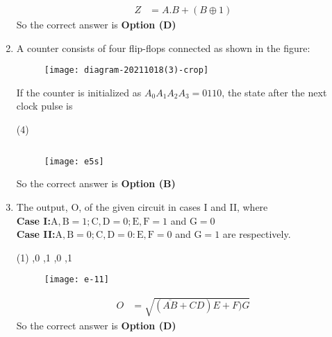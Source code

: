 \begin{enumerate}
\begin{answer}
\begin{align*}
Z&=A . B+(B \oplus 1)
\end{align*}
So the correct answer is \textbf{Option (D)}
\end{answer}
	\item A counter consists of four flip-flops connected as shown in the figure:\\
	\begin{figure}[H]
		\centering
		\texttt{[image: diagram-20211018(3)-crop]}
	\end{figure}
	If the counter is initialized as $A_{0} A_{1} A_{2} A_{3}=0110$, the state after the next clock pulse is
	{}
\begin{tasks}(4)
\end{tasks}
\begin{answer}$\left. \right. $
\begin{figure}[H]
	\centering
	\texttt{[image: e5s]}
\end{figure}
So the correct answer is \textbf{Option (B)}
\end{answer}
	\item The output, $\mathrm{O}$, of the given circuit in cases I and II, where\\
	\textbf{Case I:}\quad $\mathrm{A}, \mathrm{B}=1 ; \mathrm{C}, \mathrm{D}=0 ; \mathrm{E}, \mathrm{F}=1$ and $\mathrm{G}=0$\\
	\textbf{Case II:}\quad $\mathrm{A}, \mathrm{B}=0 ; \mathrm{C}, \mathrm{D}=0: \mathrm{E}, \mathrm{F}=0$ and $\mathrm{G}=1$ are respectively.
	{}
\begin{minipage}{0.45\textwidth}
\begin{tasks}(1)
	,0
	,1
	,0
	,1
\end{tasks}
\end{minipage}
\begin{minipage}{0.45\textwidth}
\begin{figure}[H]
	\centering
	\texttt{[image: e-11]}
\end{figure}
\end{minipage}
\begin{answer}
\begin{align*}
O&=\sqrt{(\overline{A B}+C D) E+F) G}
\end{align*}
So the correct answer is \textbf{Option (D)}
\end{answer}

\end{enumerate}
